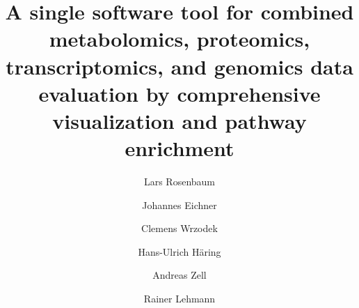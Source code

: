 \documentclass[final,5p,times,twocolumn]{elsarticle}
\newcommand\red[1]{{\color{red}#1}}
\begin{document}
\begin{frontmatter}



\title{\red{A single software tool for combined metabolomics, proteomics, transcriptomics, and genomics data evaluation by comprehensive visualization and pathway enrichment}}


\author[uni]{Lars Rosenbaum}
\author[uni]{Johannes Eichner}
\author[uni]{Clemens Wrzodek}
\author[idm,endo,dzd]{Hans-Ulrich H\"aring}
\author[uni]{Andreas Zell}
\author[idm,zentrallabor,dzd]{Rainer Lehmann}
\address[uni]{Center for Bioinformatics, University of T\"ubingen, T\"ubingen, Germany}
\address[idm]{Institute for Diabetes Research and Metabolic Diseases of the Helmholtz Centre Munich at the University of T\"ubingen, T\"ubingen, Germany}
\address[endo]{Division of Endocrinology, Diabetology, Vascular Medicine, Nephrology and Clinical Chemistry, Department of Internal Medicine IV, University Hospital T\"ubingen, T\"ubingen, Germany}
\address[zentrallabor]{Division of Clinical Chemistry and Pathobiochemistry, Department of Internal Medicine IV, University Hospital T\"ubingen, T\"ubingen, Germany}
\address[dzd]{German Center for Diabetes Research (DZD), Germany}



\end{frontmatter}
\end{document}
